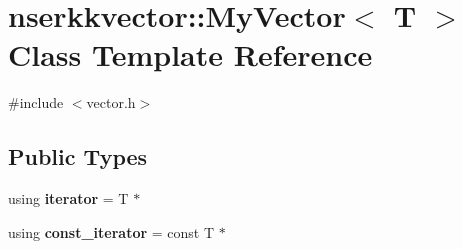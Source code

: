 \hypertarget{classnserkkvector_1_1MyVector}{\section{nserkkvector\-:\-:My\-Vector$<$ T $>$ Class Template Reference}
\label{classnserkkvector_1_1MyVector}
}


{\ttfamily \#include $<$vector.\-h$>$}

\subsection*{Public Types}
\begin{DoxyCompactItemize}
\item 
\hypertarget{classnserkkvector_1_1MyVector_af2532d112ac2aba9021f39363b0bcc85}{using {\bfseries iterator} = T $\ast$}\label{classnserkkvector_1_1MyVector_af2532d112ac2aba9021f39363b0bcc85}

\item 
\hypertarget{classnserkkvector_1_1MyVector_a86745c2740ee00848df38e9c38d9d1d2}{using {\bfseries const\-\_\-iterator} = const T $\ast$}\label{classnserkkvector_1_1MyVector_a86745c2740ee00848df38e9c38d9d1d2}

\end{DoxyCompactItemize}
